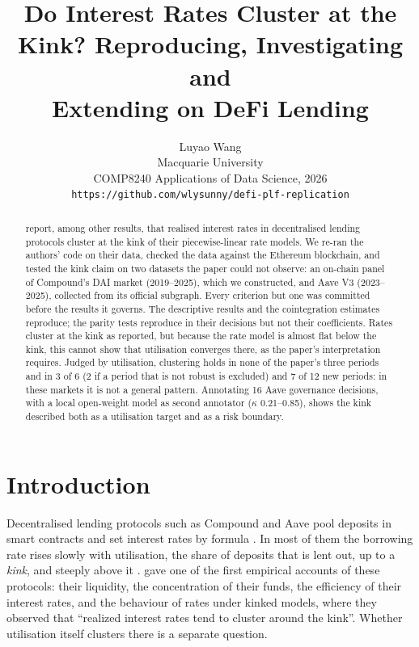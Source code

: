 \documentclass[11pt]{article}
\title{Do Interest Rates Cluster at the Kink? Reproducing, Investigating and\\ Extending \citet{gudgeon2020defi} on DeFi Lending}
\author{Luyao Wang \\
  Macquarie University \\
  COMP8240 Applications of Data Science, 2026 \\
  \texttt{https://github.com/wlysunny/defi-plf-replication}}
\begin{document}
\maketitle

\begin{abstract}
\citet{gudgeon2020defi} report, among other results, that realised interest rates in decentralised lending protocols cluster at the kink of their piecewise-linear rate models. We re-ran the authors' code on their data, checked the data against the Ethereum blockchain, and tested the kink claim on two datasets the paper could not observe: an on-chain panel of Compound's DAI market (2019--2025), which we constructed, and Aave V3 (2023--2025), collected from its official subgraph. Every criterion but one was committed before the results it governs. The descriptive results and the cointegration estimates reproduce; the parity tests reproduce in their decisions but not their coefficients. Rates cluster at the kink as reported, but because the rate model is almost flat below the kink, this cannot show that utilisation converges there, as the paper's interpretation requires. Judged by utilisation, clustering holds in none of the paper's three periods and in 3 of 6 (2 if a period that is not robust is excluded) and 7 of 12 new periods: in these markets it is not a general pattern. Annotating 16 Aave governance decisions, with a local open-weight model as second annotator ($\kappa$ 0.21--0.85), shows the kink described both as a utilisation target and as a risk boundary.
\end{abstract}

\section{Introduction}

Decentralised lending protocols such as Compound and Aave pool deposits in smart contracts and set interest rates by formula \citep{bartoletti2021sok,werner2022sok}. In most of them the borrowing rate rises slowly with utilisation, the share of deposits that is lent out, up to a \emph{kink}, and steeply above it \citep{aave2022v3}. \citet{gudgeon2020defi} gave one of the first empirical accounts of these protocols: their liquidity, the concentration of their funds, the efficiency of their interest rates, and the behaviour of rates under kinked models, where they observed that ``realized interest rates tend to cluster around the kink''. Whether utilisation itself clusters there is a separate question.
\end{document}
